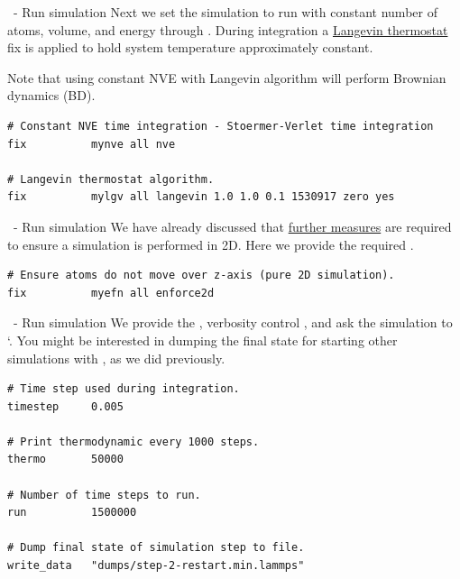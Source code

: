 \begin{frame}[fragile]{\secname}{\subsecname\ - Run simulation}
Next we set the simulation to run with constant number of atoms, volume, and energy through  . During integration a \href{https://doi.org/10.1103/PhysRevB.17.1302}{Langevin thermostat} fix is applied to hold system temperature approximately constant.

\vspace{0.5cm}

Note that using constant NVE with Langevin algorithm will perform Brownian
dynamics (BD).

\vspace{0.5cm}

\begin{lstlisting}[language=LAMMPS,basicstyle=\small]
# Constant NVE time integration - Stoermer-Verlet time integration
fix          mynve all nve

# Langevin thermostat algorithm.
fix          mylgv all langevin 1.0 1.0 0.1 1530917 zero yes
\end{lstlisting}
\end{frame}

\begin{frame}[fragile]{\secname}{\subsecname\ - Run simulation}
We have already discussed that \href{https://docs.lammps.org/Howto_2d.html}{further measures} are required to ensure a simulation is performed in 2D. Here we provide the required .

\vspace{0.5cm}

\begin{lstlisting}[language=LAMMPS,basicstyle=\small]
# Ensure atoms do not move over z-axis (pure 2D simulation).
fix          myefn all enforce2d
\end{lstlisting}
\end{frame}

\begin{frame}[fragile]{\secname}{\subsecname\ - Run simulation}
We provide the , verbosity control , and ask the simulation to `. You might be interested in dumping the final state for starting other simulations with , as we did previously.

\vspace{0.5cm}

\begin{lstlisting}[language=LAMMPS,basicstyle=\small]
# Time step used during integration.
timestep     0.005

# Print thermodynamic every 1000 steps.
thermo       50000

# Number of time steps to run.
run          1500000

# Dump final state of simulation step to file.
write_data   "dumps/step-2-restart.min.lammps"
\end{lstlisting}
\end{frame}

